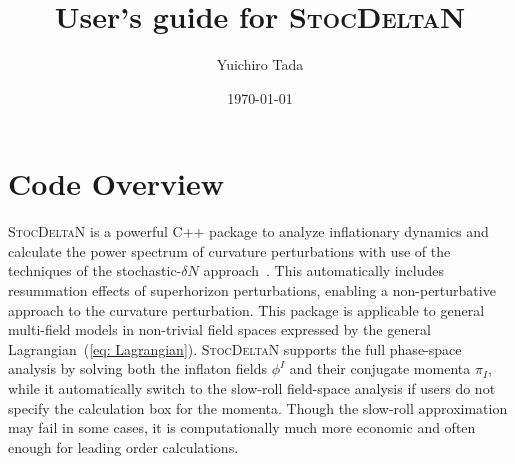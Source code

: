 \documentclass[aps, prd
, preprint
, nofootinbib 
, notitlepage
, superscriptaddress
, longbibliography
]{revtex4-1}
\newcommand{\Blue}[1]{\textcolor{blue}{\sffamily #1}}
\begin{document}
\title{User's guide for \textsc{StocDeltaN}}%
\date{\today}

\author{Yuichiro Tada}



\maketitle

\section{Code Overview}

\textsc{StocDeltaN} is a powerful C++ package to analyze inflationary dynamics and calculate the power spectrum of curvature perturbations with use of the techniques of 
the stochastic-$\delta N$ approach~\cite{Fujita:2013cna,Vennin:2015hra}. 
This automatically includes resummation effects of superhorizon perturbations, enabling a non-perturbative approach to the curvature perturbation.
This package is applicable to general multi-field models in non-trivial field spaces expressed by the general Lagrangian~(\ref{eq: Lagrangian}).
\textsc{StocDeltaN} supports the full phase-space analysis by solving both the inflaton fields $\phi^I$ and their conjugate momenta $\pi_I$, while it automatically switch to the slow-roll field-space analysis if users do not specify the calculation box for the momenta.
Though the slow-roll approximation may fail in some cases, it is computationally much more economic and often enough for leading order calculations.

\end{document}
